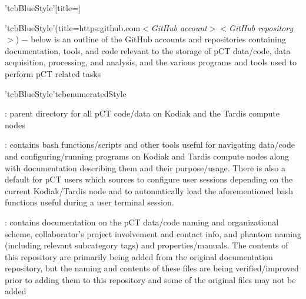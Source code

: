 \begin{tcbfunctionenv}'tcbBlueStyle'[title=]
\begin{tcbparagraph}'tcbBlueStyle'(title=https:\dirsep\dirsep github.com\dirsep$<$\emph{GitHub account}$>$\dirsep$<$\emph{GitHub repository}$>$)
$\boldsymbol{-}$ below is an outline of the GitHub accounts and repositories containing documentation, tools, and code relevant to the storage of pCT data/code, data acquisition, processing, and analysis, and the various programs and tools used to perform pCT related tasks
\end{tcbparagraph}
\begin{tcbparagraph}'tcbBlueStyle'{tcbenumeratedStyle}
\begin{deepList}[labelindent=1pt, leftmargin=*]
	\item {} : parent directory for all pCT code/data on Kodiak and the Tardis compute nodes
	\begin{deepList}[labelindent=1pt, leftmargin=*]
		\item {} : contains bash functions/scripts and other tools useful for navigating data/code and configuring/running programs on Kodiak and Tardis compute nodes along with documentation describing them and their purpose/usage.  There is also a default  for pCT users which sources  to configure user sessions depending on the current Kodiak/Tardis node and  to automatically load the aforementioned bash functions useful during a user terminal session.
		\item {} : contains documentation on the pCT data/code naming and organizational scheme, collaborator's project involvement and contact info, and phantom naming (including relevant subcategory tags) and properties/manuals.  The contents of this repository are primarily being added from the original  documentation repository, but the naming and contents of these files are being verified/improved prior to adding them to this repository and some of the original files may not be added

\end{deepList}
\end{deepList}
\end{tcbparagraph}
\end{tcbfunctionenv}
